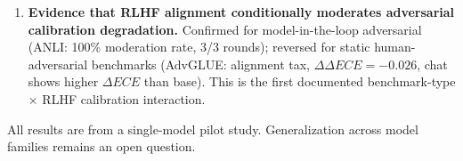 \begin{enumerate}
\item \textbf{Evidence that RLHF alignment conditionally moderates adversarial calibration degradation.} Confirmed for model-in-the-loop adversarial (ANLI: 100\% moderation rate, 3/3 rounds); reversed for static human-adversarial benchmarks (AdvGLUE: alignment tax, $\Delta \Delta ECE = -0.026$, chat shows higher $\Delta ECE$ than base). This is the first documented benchmark-type $\times$ RLHF calibration interaction.
\end{enumerate}

All results are from a single-model pilot study. Generalization across model families remains an open question.

